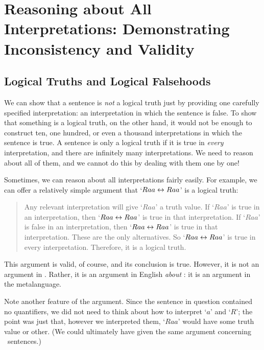 \chapter[Reasoning about All Interpretations]{Reasoning about All Interpretations: Demonstrating Inconsistency and Validity}\label{s:All.Interp}

\section{Logical Truths and Logical Falsehoods}
We can show that a sentence is \emph{not} a logical truth just by providing one carefully specified interpretation: an interpretation in which the sentence is false. To show that something is a logical truth, on the other hand, it would not be enough to construct ten, one hundred, or even a thousand interpretations in which the sentence is true. A sentence is only a logical truth if it is true in \emph{every} interpretation, and there are infinitely many interpretations. We need to reason about all of them, and we cannot do this by dealing with them one by one!

Sometimes, we can reason about all interpretations fairly easily. For example, we can offer a relatively simple argument that `$Raa\leftrightarrow Raa$' is a logical truth:
	\begin{quote}
		\label{allmodels1}
		Any relevant interpretation will give `$Raa$' a truth value. If `$Raa$' is true in an interpretation, then `$Raa \leftrightarrow Raa$' is true in that interpretation. If `$Raa$' is false in an interpretation, then `$Raa \leftrightarrow Raa$' is true in that interpretation. These are the only alternatives. So `$Raa \leftrightarrow Raa$' is true in every interpretation. Therefore, it is a logical truth.
	\end{quote}
This argument is valid, of course, and its conclusion is true. However, it is not an argument in \FOL. Rather, it is an argument in English \emph{about} \FOL: it is an argument in the metalanguage. 

Note another feature of the argument. Since the sentence in question contained no quantifiers, we did not need to think about how to interpret `$a$' and `$R$'; the point was just that, however we interpreted them, `$Raa$' would have some truth value or other. (We could ultimately have given the same argument concerning \TFL\ sentences.)

